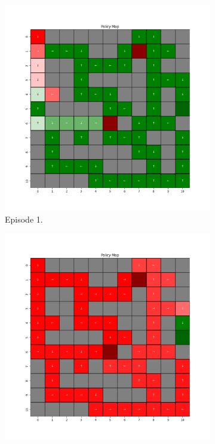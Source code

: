 \documentclass{assignment}
\begin{document}
\begin{figure}[H]
    \begin{subfigure}{0.3\textwidth}
        \includegraphics[width=\textwidth]{figures/policy_q/gamma_sweep/policy_alpha_0.1_gamma_0.75_epsilon_0.2_iteration_1.png}
    \caption{Episode 1.}
    \end{subfigure}\hfill
    \begin{subfigure}{0.3\textwidth}
        \includegraphics[width=\textwidth]{figures/policy_q/gamma_sweep/policy_alpha_0.1_gamma_0.75_epsilon_0.2_iteration_50.png}

\end{subfigure}
\end{figure}
\end{document}
